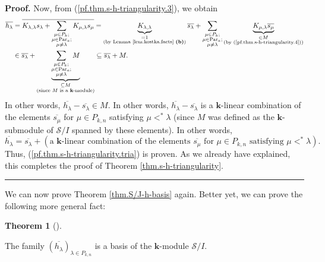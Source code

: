 \documentclass[numbers=enddot,12pt,final,onecolumn,notitlepage]{scrartcl}%
\theoremstyle{definition}
\newtheorem{theo}{Theorem}[section]
\newenvironment{theorem}[1][]
{\begin{theo}[#1]\begin{leftbar}}
{\end{leftbar}\end{theo}}
\newenvironment{proof}[1][Proof]{\noindent\textbf{#1.} }{\ \rule{0.5em}{0.5em}}
\let\sumnonlimits\sum
\renewcommand{\sum}{\sumnonlimits\limits}
\begin{document}
\begin{proof}
Now, from (\ref{pf.thm.s-h-triangularity.3}), we obtain%
\begin{align*}
\overline{h_{\lambda}}  &  =\overline{K_{\lambda,\lambda}s_{\lambda}%
+\sum_{\substack{\mu\in P_{k};\\\mu\in\operatorname*{Par}\nolimits_{a}%
;\\\mu\neq\lambda}}K_{\mu,\lambda}s_{\mu}}=\underbrace{K_{\lambda,\lambda}%
}_{\substack{=1\\\text{(by Lemma \ref{lem.kostka.facts} \textbf{(b)})}%
}}\overline{s_{\lambda}}+\sum_{\substack{\mu\in P_{k};\\\mu\in
\operatorname*{Par}\nolimits_{a};\\\mu\neq\lambda}}\underbrace{K_{\mu,\lambda
}\overline{s_{\mu}}}_{\substack{\in M\\\text{(by
(\ref{pf.thm.s-h-triangularity.4}))}}}\\
&  \in\overline{s_{\lambda}}+\underbrace{\sum_{\substack{\mu\in P_{k};\\\mu
\in\operatorname*{Par}\nolimits_{a};\\\mu\neq\lambda}}M}_{\substack{\subseteq
M\\\text{(since }M\text{ is a }\mathbf{k}\text{-module)}}}\subseteq
\overline{s_{\lambda}}+M.
\end{align*}
In other words, $\overline{h_{\lambda}}-\overline{s_{\lambda}}\in M$. In other
words, $\overline{h_{\lambda}}-\overline{s_{\lambda}}$ is a $\mathbf{k}%
$-linear combination of the elements $\overline{s_{\mu}}$ for $\mu\in P_{k,n}$
satisfying $\mu<^{\ast}\lambda$ (since $M$ was defined as the $\mathbf{k}%
$-submodule of $\mathcal{S}/I$ spanned by these elements). In other words,%
\[
\overline{h_{\lambda}}=\overline{s_{\lambda}}+\left(  \text{a }\mathbf{k}%
\text{-linear combination of the elements }\overline{s_{\mu}}\text{ for }%
\mu\in P_{k,n}\text{ satisfying }\mu<^{\ast}\lambda\right)  .
\]
Thus, (\ref{pf.thm.s-h-triangularity.tria}) is proven. As we already have
explained, this completes the proof of Theorem \ref{thm.s-h-triangularity}.
\end{proof}

We can now prove Theorem \ref{thm.S/J-h-basis} again. Better yet, we can prove
the following more general fact:

\begin{theorem}
\label{thm.S/J-h-basis-ainS}The family $\left(  \overline{h_{\lambda}}\right)
_{\lambda\in P_{k,n}}$ is a basis of the $\mathbf{k}$-module $\mathcal{S}/I$.
\end{theorem}
\end{document}
